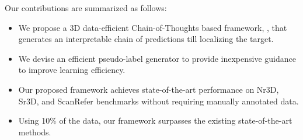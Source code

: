 Our contributions are summarized as follows:
\begin{itemize}
    \item We propose a 3D data-efficient Chain-of-Thoughts based framework, {\papernameAbbrev}, that generates an interpretable chain of predictions till localizing the target.
    \item We devise an efficient pseudo-label generator to provide inexpensive guidance to improve learning efficiency.
   \item Our proposed framework achieves state-of-the-art performance on Nr3D, Sr3D, and ScanRefer benchmarks without requiring manually annotated data.
    \item Using 10\% of the data, our framework surpasses the existing state-of-the-art methods.
\end{itemize}